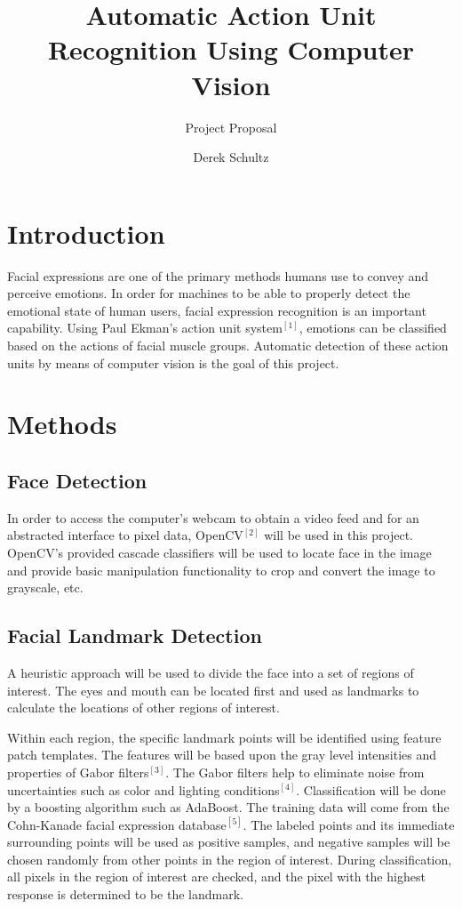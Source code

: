 \documentclass[12pt,a4paper]{scrartcl}
\author{Derek Schultz}
\title{Automatic Action Unit Recognition Using Computer Vision}
\subtitle{Project Proposal}
\begin{document}
	\begin{titlepage}
		\maketitle	
	\end{titlepage}
	
	\section{Introduction}
	Facial expressions are one of the primary methods humans use to convey and perceive emotions. In order for machines to be able to properly detect the emotional state of human users, facial expression recognition is an important capability. Using Paul Ekman's action unit system$^{[1]}$, emotions can be classified based on the actions of facial muscle groups. Automatic detection of these action units by means of computer vision is the goal of this project.
	
	\section{Methods}
	\subsection{Face Detection}
	In order to access the computer's webcam to obtain a video feed and for an abstracted interface to pixel data, OpenCV$^{[2]}$ will be used in this project. OpenCV's provided cascade classifiers will be used to locate face in the image and provide basic manipulation functionality to crop and convert the image to grayscale, etc.
	
	\subsection{Facial Landmark Detection}
	A heuristic approach will be used to divide the face into a set of regions of interest. The eyes and mouth can be located first and used as landmarks to calculate the locations of other regions of interest.
	
	Within each region, the specific landmark points will be identified using feature patch templates. The features will be based upon the gray level intensities and properties of Gabor filters$^{[3]}$. The Gabor filters help to eliminate noise from uncertainties such as color and lighting conditions$^{[4]}$. Classification will be done by a boosting algorithm such as AdaBoost. The training data will come from the Cohn-Kanade facial expression
database$^{[5]}$. The labeled points and its immediate surrounding points will be used as positive samples, and negative samples will be chosen randomly from other points in the region of interest. During classification, all pixels in the region of interest are checked, and the pixel with the highest response is determined to be the landmark.
	
\end{document}
